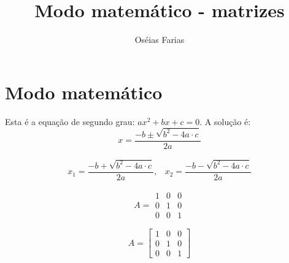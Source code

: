 \documentclass{article}
\begin{document}
	
	\title{\textbf{{\Huge Modo matemático - matrizes}}} %
	\author{Oséias Farias} %
	\date{} %
	\maketitle %
	\thispagestyle{empty} %
	\newpage
	
	\setcounter{page}{1} %
	\tableofcontents %
	\newpage
	
	\listoffigures %
	\newpage
	
	\listoftables %
	\newpage

	\setcounter{page}{1} %
	
	\section{Modo matemático}

    Esta é a equação de segundo grau: $ ax^2 +bx +c=0 $. A solução é:
    \begin{equation*}
    	x = \frac{-b \pm \sqrt{b^2 -4a\cdot c}}{2a}
    \end{equation*}
    
    \begin{equation*}
    	\begin{array}{cc}
    	x_1 = \dfrac{-b + \sqrt{b^2 -4a\cdot c}}{2a}, & 
    	x_2 = \dfrac{-b - \sqrt{b^2 -4a\cdot c}}{2a}
    	\end{array}	
    \end{equation*}
    
    \begin{equation*}
    	A = \begin{matrix}
    	1 & 0 & 0  \\
    	0 & 1 & 0  \\
    	0 & 0 & 1
    	\end{matrix}    	
    \end{equation*}
    
    \begin{equation*}
	    A = \begin{bmatrix}
	    1 & 0 & 0  \\
	    0 & 1 & 0  \\
	    0 & 0 & 1
	    \end{bmatrix}    	
    \end{equation*}
    
\end{document}
